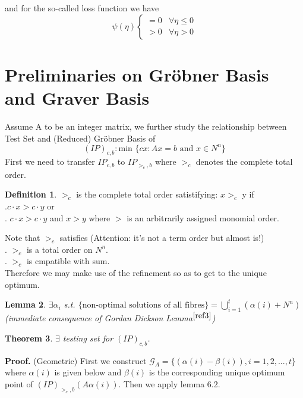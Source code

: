 \documentclass{article}
\theoremstyle{plain}
\newtheorem{theorem}{Theorem}[section]
\newtheorem{lemma}[theorem]{Lemma}
\theoremstyle{definition}
\newtheorem{definition}[theorem]{Definition}
\begin{document}
and  for the so-called loss function we have
$$
\psi(\eta)\left\{\begin{array}{ll}
=0 & \forall \eta \leq 0 \\
>0 & \forall \eta>0
\end{array}\right.
$$

\section{Preliminaries on Gröbner Basis and Graver Basis}

Assume A to be an integer matrix, we further study the relationship between Test Set and (Reduced) Gröbner Basis of 
$$(IP)_{c,b}: \text{min } \{cx: Ax=b \text{ and } x\in N^{n}\}
$$
First we need to transfer $IP_{c,b}$ to $IP_{>_{c},b}$ where $>_c$ denotes the complete total order. 

\begin{definition}$>_c$ is the complete total order satistifying: $x>_c$ y  if \\
.$c\cdot x>c\cdot y$ or\\
. $c\cdot x>c\cdot y$ and $x>y$ where $>$ is an arbitrarily assigned monomial order.
\end{definition}

Note that $>_c$ satisfies (Attention: it's not a term order but almost is!)\\
. $>_c$ is a total order on $N^{n}$. \\
. $>_c$ is cmpatible with sum. \\

Therefore we may make use of the refinement so as to get to the unique optimum.

\begin{lemma} $\exists \alpha_{i}$ s.t. $\{\text{non-optimal solutions of all fibres}\}=\bigcup_{i=1}^{t}(\alpha(i)+N^{n})$  (immediate consequence of Gordan Dickson Lemma$^{\cite{ref3}}$) \end{lemma}

\begin{theorem} $\exists$ testing set for $(IP)_{c,b}$. \end{theorem}

\noindent\textbf{Proof.} (Geometric)  First we construct $\mathcal{G}_{A}=\{(\alpha(i)-\beta(i)),i=1,2,...,t\}$ where $\alpha(i)$ is given below and $\beta(i)$ is the corresponding unique optimum point of $(IP)_{>_c,b}(A \alpha (i))$.  Then we apply lemma 6.2.
\end{document}
